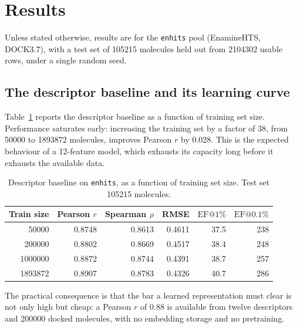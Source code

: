 \section{Results}
\label{sec:results}

Unless stated otherwise, results are for the \texttt{enhits} pool
(EnamineHTS, DOCK3.7), with a test set of \num{105215} molecules held out from
\num{2104302} usable rows, under a single random seed.

\subsection{The descriptor baseline and its learning curve}
\label{sec:results-baseline}

Table~\ref{tab:baseline-curve} reports the descriptor baseline as a function of
training set size. Performance saturates early: increasing the training set by
a factor of \num{38}, from \num{50000} to \num{1893872} molecules, improves
Pearson $r$ by \num{0.028}. This is the expected behaviour of a \num{12}-feature
model, which exhausts its capacity long before it exhausts the available data.

\begin{table}[t]
\centering
\caption{Descriptor baseline on \texttt{enhits}, as a function of training set
size. Test set \num{105215} molecules.}
\label{tab:baseline-curve}
\small
\begin{tabular}{rrrrrr}
\toprule
Train size & Pearson $r$ & Spearman $\rho$ & RMSE & $\mathrm{EF}@1\%$ & $\mathrm{EF}@0.1\%$ \\
\midrule
\num{50000}   & 0.8748 & 0.8613 & 0.4611 & 37.5 & 238 \\
\num{200000}  & 0.8802 & 0.8669 & 0.4517 & 38.4 & 248 \\
\num{1000000} & 0.8872 & 0.8744 & 0.4391 & 38.7 & 257 \\
\num{1893872} & 0.8907 & 0.8783 & 0.4326 & 40.7 & 286 \\
\bottomrule
\end{tabular}
\end{table}

The practical consequence is that the bar a learned representation must clear
is not only high but cheap: a Pearson $r$ of \num{0.88} is available from
twelve descriptors and \num{200000} docked molecules, with no embedding
storage and no pretraining.

